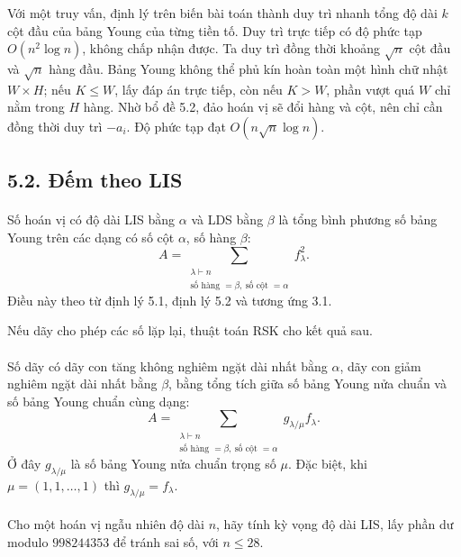\documentclass[11pt]{article}
\begin{document}
Với một truy vấn, định lý trên biến bài toán thành duy trì nhanh tổng độ dài
\(k\) cột đầu của bảng Young của từng tiền tố. Duy trì trực tiếp có độ phức
tạp \(O(n^2\log n)\), không chấp nhận được. Ta duy trì đồng thời khoảng
\(\sqrt n\) cột đầu và \(\sqrt n\) hàng đầu. Bảng Young không thể phủ kín hoàn
toàn một hình chữ nhật \(W\times H\); nếu \(K\le W\), lấy đáp án trực tiếp,
còn nếu \(K>W\), phần vượt quá \(W\) chỉ nằm trong \(H\) hàng. Nhờ bổ đề 5.2,
đảo hoán vị sẽ đổi hàng và cột, nên chỉ cần đồng thời duy trì \(-a_i\). Độ
phức tạp đạt \(O(n\sqrt n\log n)\).

\subsection*{5.2. Đếm theo LIS}

\paragraph{}
Số hoán vị có độ dài LIS bằng \(\alpha\) và LDS bằng \(\beta\) là tổng bình
phương số bảng Young trên các dạng có số cột \(\alpha\), số hàng \(\beta\):
\[
A=\sum_{\substack{\lambda\vdash n\\
\text{số hàng }=\beta,\ \text{số cột }=\alpha}} f_\lambda^2.
\]
Điều này theo từ định lý 5.1, định lý 5.2 và tương ứng 3.1.

Nếu dãy cho phép các số lặp lại, thuật toán RSK cho kết quả sau.

\paragraph{}
Số dãy có dãy con tăng không nghiêm ngặt dài nhất bằng \(\alpha\), dãy con
giảm nghiêm ngặt dài nhất bằng \(\beta\), bằng tổng tích giữa số bảng Young
nửa chuẩn và số bảng Young chuẩn cùng dạng:
\[
A=\sum_{\substack{\lambda\vdash n\\
\text{số hàng }=\beta,\ \text{số cột }=\alpha}} g_{\lambda/\mu} f_\lambda.
\]
Ở đây \(g_{\lambda/\mu}\) là số bảng Young nửa chuẩn trọng số \(\mu\). Đặc
biệt, khi \(\mu=(1,1,\ldots,1)\) thì \(g_{\lambda/\mu}=f_\lambda\).

\paragraph{}
Cho một hoán vị ngẫu nhiên độ dài \(n\), hãy tính kỳ vọng độ dài LIS, lấy
phần dư modulo \(998244353\) để tránh sai số, với \(n\le28\).
\end{document}
